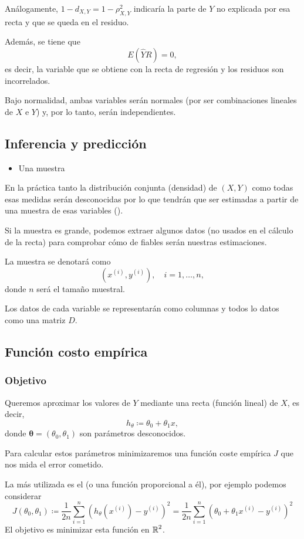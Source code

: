 Análogamente, $1-d_{X,Y}=1-\rho_{X,Y}^2$ indicaría la parte de $Y$ no explicada por esa recta y que se queda en el residuo.

Además, se tiene que \[ E(\hat{Y}R)=0, \] es decir, la variable que se obtiene con la recta de regresión y los residuos son incorrelados.

Bajo normalidad, ambas variables serán normales (por ser combinaciones lineales de $X$ e $Y$) y, por lo tanto, serán independientes.
\subsection{Inferencia y predicción}
\begin{itemize}[label=\color{red}\textbullet, leftmargin=*]
	\item \color{lightblue}Una muestra
\end{itemize}
En la práctica tanto la distribución conjunta (densidad) de $(X,Y)$ como todas esas medidas serán desconocidas por lo que tendrán que ser estimadas a partir de una muestra de esas variables ().

Si la muestra es grande, podemos extraer algunos datos (no usados en el cálculo de la recta) para comprobar cómo de fiables serán nuestras estimaciones.

La muestra se denotará como \[ \left(x^{(i)},y^{(i)}\right),\quad i=1,\dots,n, \]donde $n$ será el tamaño muestral.

Los datos de cada variable se representarán como columnas y todos lo datos como una matriz $D$.
\subsection{Función costo empírica}
\subsubsection{Objetivo}
Queremos aproximar los valores de $Y$ mediante una recta (función lineal) de $X$, es decir, \[ h_\theta\coloneq\theta_0+\theta_1x, \]donde $\mathbf{\theta}=(\theta_0,\theta_1)$ son parámetros desconocidos.

Para calcular estos parámetros minimizaremos una función coste empírica $J$ que nos mida el error cometido.

La más utilizada es el  (o una función proporcional a él), por ejemplo podemos considerar \[ J(\theta_0,\theta_1)\coloneq\dfrac{1}{2n}\sum_{i=1}^{n}\left(h_\theta\left(x^{(i)} \right) - y^{(i)}\right)^2=\dfrac{1}{2n}\sum_{i=1}^{n}\left(\theta_0+\theta_1x^{(i)}-y^{(i)}\right)^2 \]
El objetivo es minimizar esta función en $\operatorname{\mathbb{R}}^2$.


